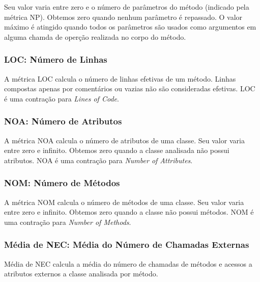	Seu valor varia entre zero e o número de parâmetros do método (indicado pela métrica NP). Obtemos zero quando nenhum parâmetro é repassado. O valor máximo é atingido quando todos os parâmetros são usados como argumentos em alguma chamda de operção realizada no corpo do método. 
                                                      
                                                             

\subsubsection{LOC: Número de Linhas}

	A métrica LOC \citep{LK94} calcula o número de linhas efetivas de um método. Linhas compostas apenas por comentários ou vazias não são consideradas efetivas. LOC é uma contração para \textit{Lines of Code}.



\subsubsection{NOA: Número de Atributos}

	A métrica NOA calcula o número de atributos de uma classe. Seu valor varia entre zero e infinito. Obtemos zero quando a classe analisada não possui atributos. NOA é uma contração para \textit{Number of Attributes}.
                          


\subsubsection{NOM: Número de Métodos}

	A métrica NOM calcula o número de métodos de uma classe. Seu valor varia entre zero e infinito. Obtemos zero quando a classe não possui métodos. NOM é uma contração para \textit{Number of Methods}.
                                                            
         

\subsubsection{Média de NEC: Média do Número de Chamadas Externas}
         
	Média de NEC calcula a média do número de chamadas de métodos e acessos a atributos externos a classe analisada por método.



